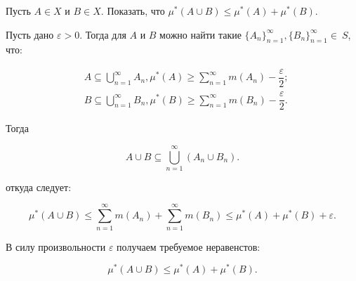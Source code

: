 \begin{task}{2}
Пусть $A \in X$ и $B \in X$. Показать, что $\mu^{*}(A \cup B) \leq \mu^{*}(A) + \mu^{*}(B)$.
\end{task}
\begin{solution}
Пусть дано $\varepsilon > 0$. Тогда для $A$ и $B$ можно найти такие $\{ A_n \}_{n=1}^{\infty} , \{ B_n \}_{n=1}^{\infty} \in~S$, что:

\begin{align*}
    &A \subseteq \bigcup_{n=1}^{\infty}{A_n}, \mu^{*}(A) \geq \sum_{n=1}^{\infty}{m(A_n)} - \dfrac{\varepsilon}{2}; \\
    &B \subseteq \bigcup_{n=1}^{\infty}{B_n}, \mu^{*}(B) \geq \sum_{n=1}^{\infty}{m(B_n)} - \dfrac{\varepsilon}{2}.
\end{align*}

Тогда

\begin{equation}
    A \cup B \subseteq \bigcup_{n=1}^{\infty}{\left( A_n \cup B_n \right)}.
\end{equation}

откуда следует:

\begin{equation}
    \mu^{*}\left( A \cup B \right) \leq \sum_{n=1}^{\infty}{m(A_n)} + \sum_{n=1}^{\infty}{m(B_n)} \leq \mu^{*}(A) + \mu^{*}(B) + \varepsilon.
\end{equation}

В силу произвольности $\varepsilon$ получаем требуемое неравенстов:

\begin{equation}
    \mu^{*}(A \cup B) \leq \mu^{*}(A) + \mu^{*}(B).
\end{equation}
\end{solution}